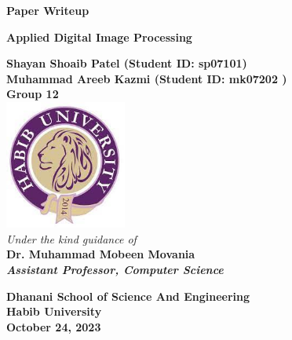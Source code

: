 \documentclass[12pt,a4paper]{article}
\begin{document}
	\begin{center}
		\begin{LARGE}			\bf{Paper Writeup\\}
		\end{LARGE}
		\vspace*{30pt}
		\textbf{Applied Digital Image Processing}
		\vspace{40pt}
		
		\textbf{
			Shayan Shoaib Patel (Student ID: sp07101)\\
			Muhammad Areeb Kazmi (Student ID: mk07202 )\\
            Group 12}\\

		\vspace{30pt}
		\includegraphics[width=0.3\textwidth]{./logo.png} \\
		\vspace{30pt}
		\textit{Under the kind guidance of}\\
		\textbf{Dr. Muhammad Mobeen Movania}\\
		\textit{\textbf{Assistant Professor, Computer Science}}
		
		
		\vspace{20pt}
		
		
		\textbf{Dhanani School of Science And Engineering\\
			Habib University\\
			October 24, 2023
		}
	\end{center}





\setlength{\oddsidemargin}{0.25in}
\setlength{\textwidth}{6.5in}
\setlength{\topmargin}{0in}
\setlength{\textheight}{8.5in}
\end{document}
